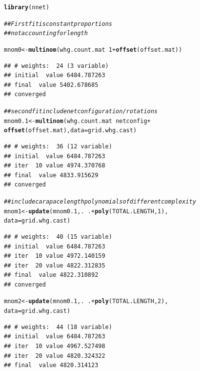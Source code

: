 \documentclass[12pt]{article}\usepackage[]{graphicx}\usepackage[]{color}
\makeatletter
\newcommand{\hlnum}[1]{\textcolor[rgb]{0.686,0.059,0.569}{#1}}%
\newcommand{\hlcom}[1]{\textcolor[rgb]{0.678,0.584,0.686}{\textit{#1}}}%
\newcommand{\hlopt}[1]{\textcolor[rgb]{0,0,0}{#1}}%
\newcommand{\hlstd}[1]{\textcolor[rgb]{0.345,0.345,0.345}{#1}}%
\newcommand{\hlkwb}[1]{\textcolor[rgb]{0.69,0.353,0.396}{#1}}%
\newcommand{\hlkwc}[1]{\textcolor[rgb]{0.333,0.667,0.333}{#1}}%
\newcommand{\hlkwd}[1]{\textcolor[rgb]{0.737,0.353,0.396}{\textbf{#1}}}%
\newenvironment{kframe}{%
 \def\at@end@of@kframe{}%
 \ifinner\ifhmode%
  \def\at@end@of@kframe{\end{minipage}}%
  \begin{minipage}{\columnwidth}%
 \fi\fi%
 \def\FrameCommand##1{\hskip\@totalleftmargin \hskip-\fboxsep
 \colorbox{shadecolor}{##1}\hskip-\fboxsep
     \hskip-\linewidth \hskip-\@totalleftmargin \hskip\columnwidth}%
 \MakeFramed {\advance\hsize-\width
   \@totalleftmargin\z@ \linewidth\hsize
   \@setminipage}}%
 {\par\unskip\endMakeFramed%
 \at@end@of@kframe}
\newenvironment{knitrout}{}{} %
\makeatother
\begin{document}
\begin{knitrout}\footnotesize
{}\color{fgcolor}\begin{kframe}
\begin{alltt}
\hlkwd{library}\hlstd{(nnet)}

\hlcom{## First fit is constant proportions}
\hlcom{## not accounting for length}

\hlstd{mnom0} \hlkwb{<-} \hlkwd{multinom}\hlstd{(whg.count.mat} \hlopt{~} \hlnum{1} \hlopt{+} \hlkwd{offset}\hlstd{(offset.mat))}
\end{alltt}
\begin{verbatim}
## # weights:  24 (3 variable)
## initial  value 6484.787263 
## final  value 5402.678685 
## converged
\end{verbatim}
\begin{alltt}
\hlcom{## second fit include net configuration/rotations}
\hlstd{mnom0.1} \hlkwb{<-} \hlkwd{multinom}\hlstd{(whg.count.mat} \hlopt{~} \hlstd{netconfig} \hlopt{+}
                    \hlkwd{offset}\hlstd{(offset.mat),} \hlkwc{data} \hlstd{= grid.whg.cast)}
\end{alltt}
\begin{verbatim}
## # weights:  36 (12 variable)
## initial  value 6484.787263 
## iter  10 value 4974.370768
## final  value 4833.915629 
## converged
\end{verbatim}
\begin{alltt}
\hlcom{## include carapace length polynomials of different complexity}
\hlstd{mnom1} \hlkwb{<-} \hlkwd{update}\hlstd{(mnom0.1, .} \hlopt{~} \hlstd{.} \hlopt{+} \hlkwd{poly}\hlstd{(TOTAL.LENGTH,} \hlnum{1}\hlstd{),}
                \hlkwc{data} \hlstd{= grid.whg.cast)}
\end{alltt}
\begin{verbatim}
## # weights:  40 (15 variable)
## initial  value 6484.787263 
## iter  10 value 4972.140159
## iter  20 value 4822.312835
## final  value 4822.310892 
## converged
\end{verbatim}
\begin{alltt}
\hlstd{mnom2} \hlkwb{<-} \hlkwd{update}\hlstd{(mnom0.1, .} \hlopt{~} \hlstd{.} \hlopt{+} \hlkwd{poly}\hlstd{(TOTAL.LENGTH,} \hlnum{2}\hlstd{),}
                \hlkwc{data} \hlstd{= grid.whg.cast)}
\end{alltt}
\begin{verbatim}
## # weights:  44 (18 variable)
## initial  value 6484.787263 
## iter  10 value 4967.527498
## iter  20 value 4820.324322
## final  value 4820.314123 

\end{verbatim}
\end{kframe}
\end{knitrout}
\end{document}
